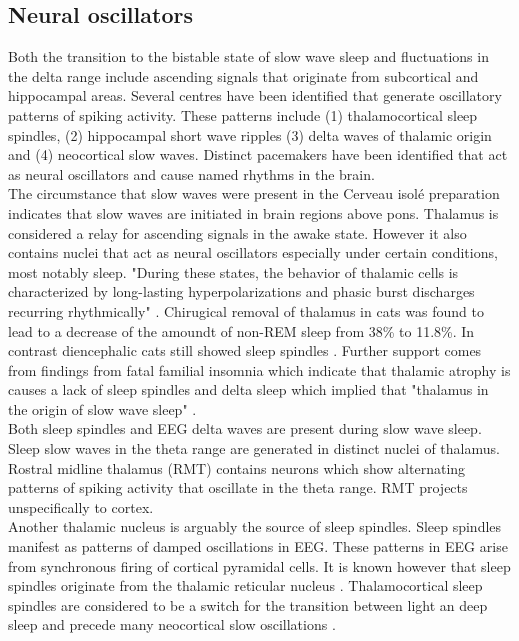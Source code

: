 \subsection{Neural oscillators}
\label{ascending_system_and_oscillators}
Both the transition to the bistable state of slow wave sleep and fluctuations in the delta range include ascending signals that originate from subcortical and hippocampal areas. Several centres have been identified that generate oscillatory patterns of spiking activity. These patterns include (1) thalamocortical sleep spindles, (2) hippocampal short wave ripples (3) delta waves of thalamic origin and (4) neocortical slow waves. Distinct pacemakers have been identified that act as neural oscillators and cause named rhythms in the brain.\\
The circumstance that slow waves were present in the Cerveau isolé preparation indicates that slow waves are initiated in brain regions above pons. Thalamus is considered a relay for ascending signals in the awake state. However it also contains nuclei that act as neural oscillators especially under certain conditions, most notably sleep. "During these states, the behavior of thalamic cells is characterized by long-lasting hyperpolarizations and phasic burst discharges recurring rhythmically" \parencite[p. 21]{steriade1984thalamus}. Chirugical removal of thalamus in cats was found to lead to a decrease of the amoundt of non-REM sleep from 38\% to 11.8\%. In contrast diencephalic cats still showed sleep spindles \parencite{montagna2005fatal}. Further support comes from findings from fatal familial insomnia which indicate that thalamic atrophy is causes a lack of sleep spindles and delta sleep which implied that "thalamus in the origin of slow wave sleep" \parencite[p. 339]{montagna2005fatal}.\\
Both sleep spindles and EEG delta waves are present during slow wave sleep. Sleep slow waves in the theta range are generated in distinct nuclei of thalamus. Rostral midline thalamus (RMT) contains neurons which show alternating patterns of spiking activity that oscillate in the theta range. RMT projects unspecifically to cortex.
\\ Another thalamic nucleus is arguably the source of sleep spindles. Sleep spindles manifest as patterns of damped oscillations in EEG. These patterns in EEG arise from synchronous firing of cortical pyramidal cells. It is known however that sleep spindles originate from the thalamic reticular nucleus \parencite{luthi2014sleep}. Thalamocortical sleep spindles are considered to be a switch for the transition between light an deep sleep and precede many neocortical slow oscillations \parencite{niethard2018cortical}.\\
